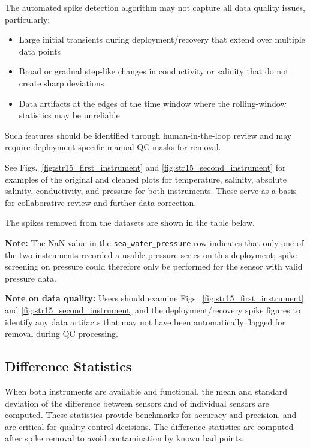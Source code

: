 The automated spike detection algorithm may not capture all data quality issues, particularly:
\begin{itemize}
    \item Large initial transients during deployment/recovery that extend over multiple data points
    \item Broad or gradual step-like changes in conductivity or salinity that do not create sharp deviations
    \item Data artifacts at the edges of the time window where the rolling-window statistics may be unreliable
\end{itemize}
Such features should be identified through human-in-the-loop review and may require deployment-specific manual QC masks for removal.

See Figs.~\ref{fig:str15_first_instrument} and \ref{fig:str15_second_instrument} for examples of the original and cleaned plots for temperature, salinity, absolute salinity, conductivity, and pressure for both instruments.
These serve as a basis for collaborative review and further data correction.

The spikes removed from the datasets are shown in the table below.



\textbf{Note:} The NaN value in the \texttt{sea\_water\_pressure} row indicates that only one of the two instruments recorded a usable pressure series on this deployment; spike screening on pressure could therefore only be performed for the sensor with valid pressure data.

\textbf{Note on data quality:} Users should examine Figs.~\ref{fig:str15_first_instrument} and \ref{fig:str15_second_instrument} and the deployment/recovery spike figures to identify any data artifacts that may not have been automatically flagged for removal during QC processing.

\subsection{Difference Statistics}
When both instruments are available and functional, 
the mean and standard deviation of the difference between sensors and of individual sensors are computed. 
These statistics provide benchmarks for accuracy and precision, and are critical for quality control decisions.
The difference statistics are computed after spike removal to avoid contamination by known bad points.

